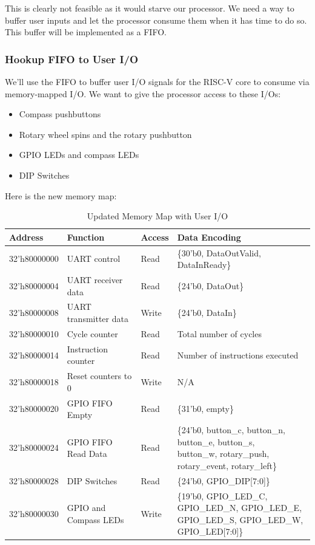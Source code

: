 \documentclass[11pt]{article}
\begin{document}
This is clearly not feasible as it would starve our processor. We need a way to buffer user inputs and let the processor consume them when it has time to do so. This buffer will be implemented as a FIFO.

\subsubsection{Hookup FIFO to User I/O}
We'll use the FIFO to buffer user I/O signals for the RISC-V core to consume via memory-mapped I/O. We want to give the processor access to these I/Os:

\begin{itemize}
	\item Compass pushbuttons
	\item Rotary wheel spins and the rotary pushbutton
	\item GPIO LEDs and compass LEDs
	\item DIP Switches
\end{itemize}

Here is the new memory map:
\begin{table}[hbt]
	\begin{center}
		\caption{Updated Memory Map with User I/O}
		\label{mem_map2}
		\begin{tabular}{l l l l}
			\toprule
			\textbf{Address} & \textbf{Function} & \textbf{Access} & \textbf{Data Encoding}\\
			\midrule
			32'h80000000 & UART control & Read & \{30'b0, DataOutValid, DataInReady\} \\
			32'h80000004 & UART receiver data & Read & \{24'b0, DataOut\} \\
			32'h80000008 & UART transmitter data & Write & \{24'b0, DataIn\} \\
			\midrule
			32'h80000010 & Cycle counter & Read & Total number of cycles \\
			32'h80000014 & Instruction counter & Read & Number of instructions executed \\
			32'h80000018 & Reset  counters to 0 & Write & N/A \\
			\midrule
			32'h80000020 & GPIO FIFO Empty & Read & \{31'b0, empty\} \\
			32'h80000024 & GPIO FIFO Read Data & Read & \makecell{ \{24'b0, button\_c, button\_n, button\_e, button\_s,\\ button\_w, rotary\_push, rotary\_event, rotary\_left\} } \\
			\midrule
			32'h80000028 & DIP Switches & Read & \{24'b0, GPIO\_DIP[7:0]\} \\
			\midrule
			32'h80000030 & GPIO and Compass LEDs & Write & \makecell{ \{19'b0, GPIO\_LED\_C, GPIO\_LED\_N, GPIO\_LED\_E, \\GPIO\_LED\_S, GPIO\_LED\_W, GPIO\_LED[7:0]\} } \\
		\end{tabular}
	\end{center}
\end{table}
\end{document}

